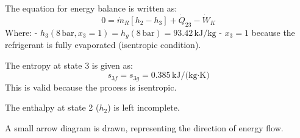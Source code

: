 The equation for energy balance is written as:  
\[
0 = \dot{m}_R \left[ h_2 - h_3 \right] + \dot{Q}_{23} - \dot{W}_K
\]  
Where:  
- \( h_3(8 \, \text{bar}, x_3 = 1) = h_g(8 \, \text{bar}) = 93.42 \, \text{kJ/kg} \)  
- \( x_3 = 1 \) because the refrigerant is fully evaporated (isentropic condition).  

The entropy at state 3 is given as:  
\[
s_{3f} = s_{3g} = 0.385 \, \text{kJ/(kg·K)}
\]  
This is valid because the process is isentropic.  

The enthalpy at state 2 (\( h_2 \)) is left incomplete.  

A small arrow diagram is drawn, representing the direction of energy flow.